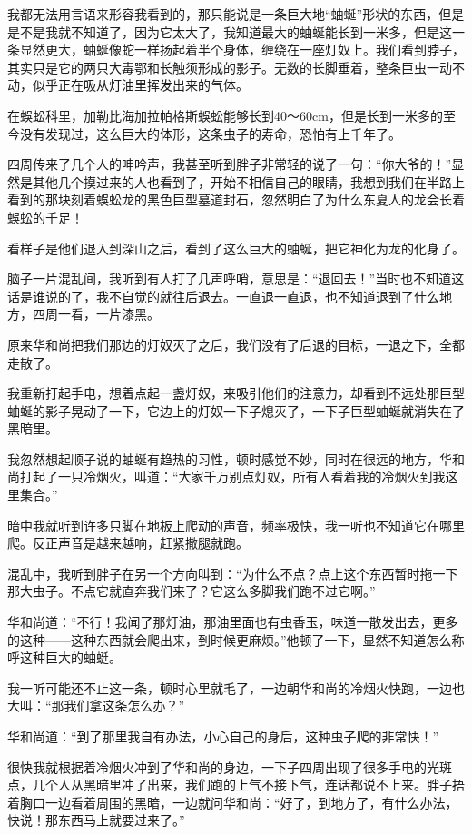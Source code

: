 我都无法用言语来形容我看到的，那只能说是一条巨大地“蚰蜒”形状的东西，但是是不是我就不知道了，因为它太大了，我知道最大的蚰蜒能长到一米多，但是这一条显然更大，蚰蜒像蛇一样扬起着半个身体，缠绕在一座灯奴上。我们看到脖子，其实只是它的两只大毒鄂和长触须形成的影子。无数的长脚垂着，整条巨虫一动不动，似乎正在吸从灯油里挥发出来的气体。

在蜈蚣科里，加勒比海加拉帕格斯蜈蚣能够长到40～60cm，但是长到一米多的至今没有发现过，这么巨大的体形，这条虫子的寿命，恐怕有上千年了。

四周传来了几个人的呻吟声，我甚至听到胖子非常轻的说了一句：“你大爷的！”显然是其他几个摸过来的人也看到了，开始不相信自己的眼睛，我想到我们在半路上看到的那块刻着蜈蚣龙的黑色巨型墓道封石，忽然明白了为什么东夏人的龙会长着蜈蚣的千足！

看样子是他们退入到深山之后，看到了这么巨大的蚰蜒，把它神化为龙的化身了。

脑子一片混乱间，我听到有人打了几声呼哨，意思是：“退回去！”当时也不知道这话是谁说的了，我不自觉的就往后退去。一直退一直退，也不知道退到了什么地方，四周一看，一片漆黑。

原来华和尚把我们那边的灯奴灭了之后，我们没有了后退的目标，一退之下，全都走散了。

我重新打起手电，想着点起一盏灯奴，来吸引他们的注意力，却看到不远处那巨型蚰蜒的影子晃动了一下，它边上的灯奴一下子熄灭了，一下子巨型蚰蜒就消失在了黑暗里。

我忽然想起顺子说的蚰蜒有趋热的习性，顿时感觉不妙，同时在很远的地方，华和尚打起了一只冷烟火，叫道：“大家千万别点灯奴，所有人看着我的冷烟火到我这里集合。”

暗中我就听到许多只脚在地板上爬动的声音，频率极快，我一听也不知道它在哪里爬。反正声音是越来越响，赶紧撒腿就跑。

混乱中，我听到胖子在另一个方向叫到：“为什么不点？点上这个东西暂时拖一下那大虫子。不点它就直奔我们来了？它这么多脚我们跑不过它啊。”

华和尚道：“不行！我闻了那灯油，那油里面也有虫香玉，味道一散发出去，更多的这种——这种东西就会爬出来，到时候更麻烦。”他顿了一下，显然不知道怎么称呼这种巨大的蚰蜓。

我一听可能还不止这一条，顿时心里就毛了，一边朝华和尚的冷烟火快跑，一边也大叫：“那我们拿这条怎么办？”

华和尚道：“到了那里我自有办法，小心自己的身后，这种虫子爬的非常快！”

很快我就根据着冷烟火冲到了华和尚的身边，一下子四周出现了很多手电的光斑点，几个人从黑暗里冲了出来，我们跑的上气不接下气，连话都说不上来。胖子捂着胸口一边看着周围的黑暗，一边就问华和尚：“好了，到地方了，有什么办法，快说！那东西马上就要过来了。”

